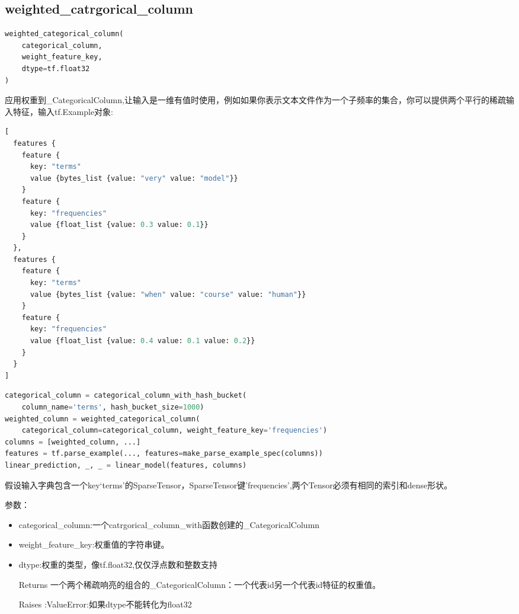 \subsection{weighted\_catrgorical\_column}
\begin{lstlisting}[language=Python]
weighted_categorical_column(
    categorical_column,
    weight_feature_key,
    dtype=tf.float32
)
\end{lstlisting}
应用权重到\_CategoricalColumn,让输入是一维有值时使用，例如如果你表示文本文件作为一个子频率的集合，你可以提供两个平行的稀疏输入特征，输入tf.Example对象:
\begin{lstlisting}[language=Python]
[
  features {
    feature {
      key: "terms"
      value {bytes_list {value: "very" value: "model"}}
    }
    feature {
      key: "frequencies"
      value {float_list {value: 0.3 value: 0.1}}
    }
  },
  features {
    feature {
      key: "terms"
      value {bytes_list {value: "when" value: "course" value: "human"}}
    }
    feature {
      key: "frequencies"
      value {float_list {value: 0.4 value: 0.1 value: 0.2}}
    }
  }
]
\end{lstlisting}
\begin{lstlisting}[language=Python]
categorical_column = categorical_column_with_hash_bucket(
    column_name='terms', hash_bucket_size=1000)
weighted_column = weighted_categorical_column(
    categorical_column=categorical_column, weight_feature_key='frequencies')
columns = [weighted_column, ...]
features = tf.parse_example(..., features=make_parse_example_spec(columns))
linear_prediction, _, _ = linear_model(features, columns)
\end{lstlisting}
假设输入字典包含一个key‘terms’的SparseTensor，SparseTensor键'frequencies',两个Tensor必须有相同的索引和dense形状。

参数：
\begin{itemize}
	\item categorical\_column:一个catrgorical\_column\_with\*函数创建的\_CategoricalColumn
	\item weight\_feature\_key:权重值的字符串键。
	\item dtype:权重的类型，像tf.float32,仅仅浮点数和整数支持
	\item[Returns]一个两个稀疏响亮的组合的\_CategoricalColumn：一个代表id另一个代表id特征的权重值。
	\item[Raises]:ValueError:如果dtype不能转化为float32
	\end{itemize}
